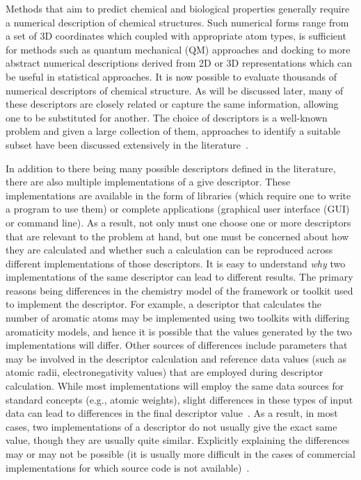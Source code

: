 \documentclass[letterpaper, 12pt]{article}
\begin{document}
Methods that aim to predict chemical and biological properties
generally require a numerical description of chemical structures. Such
numerical forms range from a set of 3D coordinates which coupled with
appropriate atom types, is sufficient for methods such as quantum
mechanical (QM) approaches and docking to more abstract numerical
descriptions derived from 2D or 3D representations which can be useful
in statistical approaches. It is now possible to evaluate thousands of
numerical descriptors of chemical structure. As will be discussed
later, many of these descriptors are closely related or capture the
same information, allowing one to be substituted for another. The
choice of descriptors is a well-known problem and given a large
collection of them, approaches to identify a suitable subset have been
discussed extensively in the
literature~\cite{Miller:2002aa,Kohavi:1997gf}.

In addition to there being many possible descriptors defined in the
literature, there are also multiple implementations of a give
descriptor. These implementations are available in the form of
libraries (which require one to write a program to use them) or
complete applications (graphical user interface (GUI) or command
line). As a result, not only must one choose one or more descriptors
that are relevant to the problem at hand, but one must be concerned
about how they are calculated and whether such a calculation can be
reproduced across different implementations of those descriptors. It
is easy to understand \emph{why} two implementations of the same
descriptor can lead to different results. The primary reasons being
differences in the chemistry model of the framework or toolkit used to
implement the descriptor. For example, a descriptor that calculates
the number of aromatic atoms may be implemented using two toolkits
with differing aromaticity models, and hence it is possible that the
values generated by the two implementations will differ. Other sources
of differences include parameters that may be involved in the
descriptor calculation and reference data values (such as atomic
radii, electronegativity values) that are employed during descriptor
calculation. While most implementations will employ the same data
sources for standard concepts (e.g., atomic weights), slight
differences in these types of input data can lead to differences in
the final descriptor value~\cite{Guha:2006ac}. As a result, in most
cases, two implementations of a descriptor do not usually give the
exact same value, though they are usually quite similar. Explicitly
explaining the differences may or may not be possible (it is usually
more difficult in the cases of commercial implementations for which
source code is not available)~\cite{Spjuth2010}.
\end{document}
